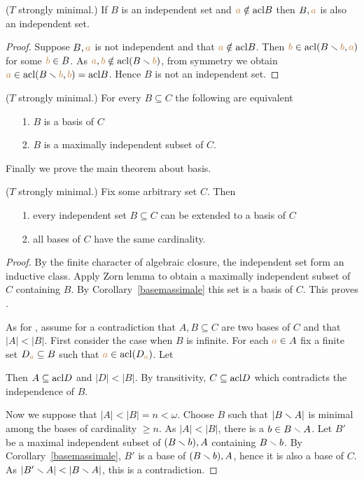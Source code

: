 \begin{lemma}\label{indipendenza+1}
  ($T$ strongly minimal.)
  If $B$ is an independent set and ${\color{brown} a}\notin {\rm acl} B$ then $B,{\color{brown} a}$ is also an independent set.
\end{lemma}
\begin{proof}
Suppose $B,{\color{brown} a}$ is not independent and that ${\color{brown} a}\notin {\rm acl} B$.
Then ${\color{brown} b}\in{\rm acl}(B\smallsetminus {\color{brown}b},{\color{brown} a})$ for some ${\color{brown} b}\in B$.
As ${\color{brown} a},{\color{brown} b}\notin{\rm acl}(B\smallsetminus {\color{brown}b})$, from symmetry we obtain ${\color{brown} a}\in{\rm acl}(B\smallsetminus {\color{brown}b},{\color{brown} b})={\rm acl} B$.
Hence $B$ is not an independent set.
\end{proof}

\begin{corollary}\label{basemassimale}
  ($T$ strongly minimal.)
  For every $B\subseteq C$ the following are equivalent
  \begin{itemize}
  \item[1.] $B$ is a basis of $C$
  \item[2.] $B$ is a maximally independent subset of $C$.
  \end{itemize}
\end{corollary}

Finally we prove the main theorem about basis.

\begin{theorem}\label{thm_cardinality_base}
  ($T$ strongly minimal.)
  Fix some arbitrary set $C$.
  Then
  \begin{itemize}
  \item[1.] every independent set $B\subseteq C$ can be extended to a basis of $C$
  \item[2.] all bases of $C$ have the same cardinality.
  \end{itemize}
\end{theorem}

\begin{proof}
  By the finite character of algebraic closure, the independent set form an inductive class.
  Apply Zorn lemma to obtain a maximally independent subset of $C$ containing $B$.
  By Corollary~\ref{basemassimale} this set is a basis of $C$.
  This proves .

  As for , assume for a contradiction that $A,B\subseteq C$ are two bases of $C$ and that $|A|<|B|$.
  First consider the case when $B$ is infinite.
  For each ${\color{brown} a}\in A$ fix a finite set $D_{\color{brown} a}\subseteq B$ such that ${\color{brown} a}\in{\rm acl}(D_{\color{brown} a})$.
  Let


  Then $A\subseteq{\rm acl} D$ and $|D|<|B|$.
  By transitivity, $C\subseteq{\rm acl} D$ which contradicts the independence of $B$.

  Now we suppose that $|A|<|B|=n<\omega$.
  Choose $B$ such that $|B\smallsetminus A|$ is minimal among the bases of cardinality $\ge n$.
  As $|A|<|B|$, there is a $b\in B\smallsetminus A$.
  Let $B'$ be a maximal independent subset of $(B\smallsetminus b),A$ containing $B\smallsetminus b$.
  By Corollary~\ref{basemassimale}, $B'$ is a base of $(B\smallsetminus b),A$, hence it is also a base of $C$.
  As $|B'\sm A|<|B\sm A|$, this is a contradiction.
\end{proof}

